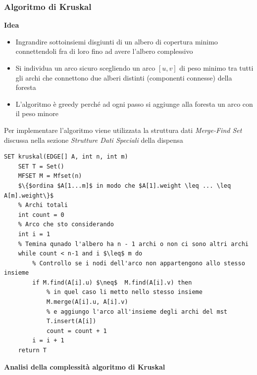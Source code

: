 \documentclass[../cheatSheetAlgoritmi.tex]{subfiles}
\begin{document}
\subsubsection{Algoritmo di Kruskal}
\textbf{Idea}
\begin{itemize}
	\item Ingrandire sottoinsiemi disgiunti di un albero di copertura minimo connettendoli fra di loro fino ad avere l’albero complessivo
	\item Si individua un arco sicuro scegliendo un arco $[u, v]$ di peso minimo tra tutti gli archi che connettono due alberi distinti (componenti connesse) della foresta
	\item L’algoritmo è greedy perché ad ogni passo si aggiunge alla foresta un arco con il peso minore
\end{itemize}
Per implementare l'algoritmo viene utilizzata la struttura dati \emph{Merge-Find Set} discussa nella sezione \emph{Strutture Dati Speciali} della dispensa
\begin{lstlisting}[caption=Albero di Copertura di Peso Minimo - Kruskal]
SET kruskal(EDGE[] A, int n, int m)
	SET T = Set()
	MFSET M = Mfset(n)
	$\{$ordina $A[1...m]$ in modo che $A[1].weight \leq ... \leq A[m].weight\}$
	% Archi totali
	int count = 0
	% Arco che sto considerando
	int i = 1
	% Temina qunado l'albero ha n - 1 archi o non ci sono altri archi
	while count < n-1 and i $\leq$ m do
		% Controllo se i nodi dell'arco non appartengono allo stesso insieme
		if M.find(A[i].u) $\neq$  M.find(A[i].v) then
			% in quel caso li metto nello stesso insieme
			M.merge(A[i].u, A[i].v)
			% e aggiungo l'arco all'insieme degli archi del mst
			T.insert(A[i])
			count = count + 1
		i = i + 1
	return T
\end{lstlisting}

\bigskip

\textbf{Analisi della complessità algoritmo di Kruskal}
\end{document}
